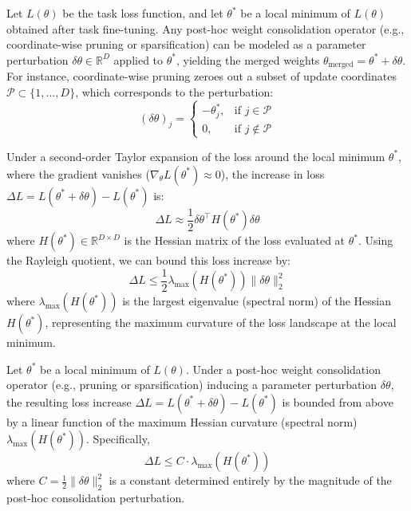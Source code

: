 Let $L(\theta)$ be the task loss function, and let $\theta^*$ be a local minimum of $L(\theta)$ obtained after task fine-tuning. Any post-hoc weight consolidation operator (e.g., coordinate-wise pruning or sparsification) can be modeled as a parameter perturbation $\delta\theta \in \mathbb{R}^D$ applied to $\theta^*$, yielding the merged weights $\theta_{\text{merged}} = \theta^* + \delta\theta$. For instance, coordinate-wise pruning zeroes out a subset of update coordinates $\mathcal{P} \subset \{1, \dots, D\}$, which corresponds to the perturbation:
\begin{equation}
  (\delta\theta)_j = 
  \begin{cases}
    -\theta^*_j, & \text{if } j \in \mathcal{P} \\
    0, & \text{if } j \notin \mathcal{P}
  \end{cases}
\end{equation}

Under a second-order Taylor expansion of the loss around the local minimum $\theta^*$, where the gradient vanishes ($\nabla_\theta L(\theta^*) \approx 0$), the increase in loss $\Delta L = L(\theta^* + \delta\theta) - L(\theta^*)$ is:
\begin{equation}
  \Delta L \approx \frac{1}{2}\delta\theta^\top H(\theta^*) \delta\theta
\end{equation}
where $H(\theta^*) \in \mathbb{R}^{D \times D}$ is the Hessian matrix of the loss evaluated at $\theta^*$. Using the Rayleigh quotient, we can bound this loss increase by:
\begin{equation}
  \Delta L \le \frac{1}{2} \lambda_{\max}(H(\theta^*)) \|\delta\theta\|_2^2
\end{equation}
where $\lambda_{\max}(H(\theta^*))$ is the largest eigenvalue (spectral norm) of the Hessian $H(\theta^*)$, representing the maximum curvature of the loss landscape at the local minimum.

\begin{proposition}
  Let $\theta^*$ be a local minimum of $L(\theta)$. Under a post-hoc weight consolidation operator (e.g., pruning or sparsification) inducing a parameter perturbation $\delta\theta$, the resulting loss increase $\Delta L = L(\theta^* + \delta\theta) - L(\theta^*)$ is bounded from above by a linear function of the maximum Hessian curvature (spectral norm) $\lambda_{\max}(H(\theta^*))$. Specifically,
  \begin{equation}
    \Delta L \le C \cdot \lambda_{\max}(H(\theta^*))
  \end{equation}
  where $C = \frac{1}{2} \|\delta\theta\|_2^2$ is a constant determined entirely by the magnitude of the post-hoc consolidation perturbation.
\end{proposition}

